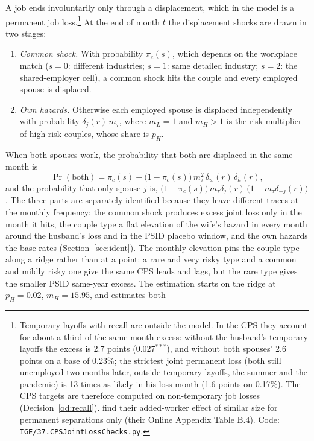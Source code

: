 \documentclass[11pt]{article}
\newcommand{\code}[1]{\texttt{#1}}
\newcommand{\1}{\mathbf{1}}
\begin{document}
A job ends involuntarily only through a displacement, which in the model is a permanent job loss.\footnote{Temporary
layoffs with recall are outside the model. In the CPS they account for about a third of the same-month excess: without
the husband's temporary layoffs the excess is 2.7 points (0.027$^{***}$), and without both spouses' 2.6 points on a base
of 0.23\%; the strictest joint permanent loss (both still unemployed two months later, outside temporary layoffs, the
summer and the pandemic) is 13 times as likely in his loss month (1.6 points on 0.17\%). The CPS targets are therefore
computed on non-temporary job losses (Decision~\ref{od:recall}). \citet{bacher2025joint} find their added-worker effect
of similar size for permanent separations only (their Online Appendix Table B.4). Code:
\code{IGE/37.CPSJointLossChecks.py}.} At the end of month $t$ the displacement shocks are drawn in two stages:
\begin{enumerate}
  \item \emph{Common shock.} With probability $\pi_c(s)$, which depends on the workplace match ($s = 0$: different
  industries; $s = 1$: same detailed industry; $s = 2$: the shared-employer cell), a common shock hits the couple and
  every employed spouse is displaced.
  \item \emph{Own hazards.} Otherwise each employed spouse is displaced independently with probability
  $\delta_j(r)\, m_\tau$, where $m_L = 1$ and $m_H > 1$ is the risk multiplier of high-risk couples, whose share
  is $p_H$.
\end{enumerate}
When both spouses work, the probability that both are displaced in the same month is
\[
  \Pr(\text{both}) = \pi_c(s) + \big(1 - \pi_c(s)\big)\, m_\tau^2\, \delta_w(r)\,\delta_h(r),
\]
and the probability that only spouse $j$ is, $\big(1 - \pi_c(s)\big)\, m_\tau\delta_j(r)\,\big(1 - m_\tau
\delta_{-j}(r)\big)$. The three parts are separately identified because they leave different traces at the monthly
frequency: the common shock produces excess joint loss only in the month it hits, the couple type a flat elevation of
the wife's hazard in every month around the husband's loss and in the PSID placebo window, and the own hazards the base
rates (Section~\ref{sec:ident}). The monthly elevation pins the couple type along a ridge rather than at a point: a rare
and very risky type and a common and mildly risky one give the same CPS leads and lags, but the rare type gives the
smaller PSID same-year excess. The estimation starts on the ridge at $p_H = 0.02$, $m_H = 15.95$, and estimates both
\end{document}
